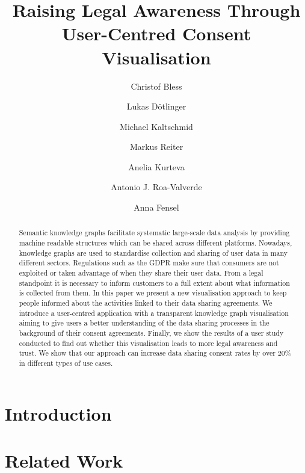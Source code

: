 \documentclass{llncs}
\title{Raising Legal Awareness Through User-Centred Consent Visualisation}
\author{Christof Bless \and Lukas Dötlinger \and Michael Kaltschmid \and Markus Reiter \and Anelia Kurteva \and Antonio J. Roa-Valverde \and Anna Fensel }
\institute{Institute of Computer Science, University of Innsbruck}
\begin{document}
\maketitle

\begin{abstract}
  Semantic knowledge graphs facilitate systematic large-scale data analysis by providing machine readable structures which can be shared across different platforms.
  Nowadays, knowledge graphs are used to standardise collection and sharing of user data in many different sectors. 
  Regulations such as the GDPR make sure that consumers
  are not exploited or taken advantage of when they share their user data.
  From a legal standpoint it is
  necessary to inform customers to a full extent about what information is
  collected from them. In this paper we present a new visualisation approach
  to keep people informed about the activities linked to their data sharing
  agreements. We introduce a user-centred application with a transparent knowledge graph
  visualisation aiming to give users a better understanding of the data sharing
  processes in the background of their consent agreements. Finally, we show
  the results of a user study conducted to find out whether this
  visualisation leads to more legal awareness and trust.
  We show that our approach can increase data sharing consent rates by over 20\% in different types of use cases.
\end{abstract}


\section{Introduction}
\label{sec:introduction}


\section{Related Work}
\label{sec:related_work}

\end{document}

